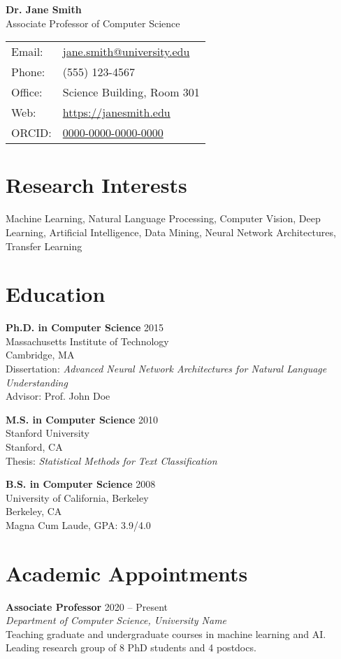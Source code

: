\documentclass[11pt,letterpaper]{article}
\newcommand{\cventry}[4]{%
  \noindent\textbf{#1} \hfill #2\\
  \textit{#3}\\
  #4
  \vspace{0.3cm}
}
\newcommand{\education}[5]{%
  \noindent\textbf{#1} \hfill #2\\
  #3\\
  #4\\
  #5
  \vspace{0.3cm}
}
\begin{document}
\begin{center}
  {\Huge\sffamily\color{titlecolor}\textbf{Dr. Jane Smith}}\\[8pt]
  {\Large\sffamily Associate Professor of Computer Science}\\[12pt]
  \begin{tabular}{l l}
    Email: & \href{mailto:jane.smith@university.edu}{jane.smith@university.edu} \\
    Phone: & (555) 123-4567 \\
    Office: & Science Building, Room 301 \\
    Web: & \href{https://janesmith.edu}{https://janesmith.edu} \\
    ORCID: & \href{https://orcid.org/0000-0000-0000-0000}{0000-0000-0000-0000}
  \end{tabular}
\end{center}

\vspace{0.5cm}

\section{Research Interests}
Machine Learning, Natural Language Processing, Computer Vision, Deep Learning, Artificial Intelligence, Data Mining, Neural Network Architectures, Transfer Learning

\section{Education}

\education{Ph.D. in Computer Science}{2015}
{Massachusetts Institute of Technology}{Cambridge, MA}
{Dissertation: \textit{Advanced Neural Network Architectures for Natural Language Understanding}\\
Advisor: Prof. John Doe}

\education{M.S. in Computer Science}{2010}
{Stanford University}{Stanford, CA}
{Thesis: \textit{Statistical Methods for Text Classification}}

\education{B.S. in Computer Science}{2008}
{University of California, Berkeley}{Berkeley, CA}
{Magna Cum Laude, GPA: 3.9/4.0}

\section{Academic Appointments}

\cventry{Associate Professor}{2020 -- Present}
{Department of Computer Science, University Name}
{Teaching graduate and undergraduate courses in machine learning and AI. Leading research group of 8 PhD students and 4 postdocs.}
\end{document}
